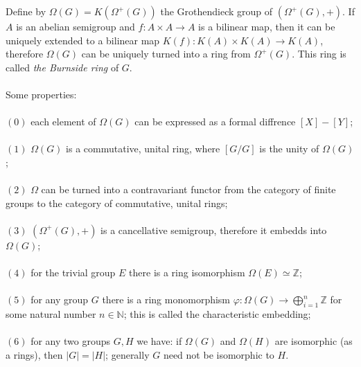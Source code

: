 \documentclass[12pt]{article}
\begin{document}
Define by $\Omega(G)=K(\Omega^{+}(G))$ the Grothendieck group of $(\Omega^{+}(G),+)$. If $A$ is an abelian semigroup and $f:A\times A\rightarrow A$ is a bilinear map, then it can be uniquely extended to a bilinear map $K(f):K(A)\times K(A)\rightarrow K(A)$, therefore $\Omega(G)$ can be uniquely turned into a ring from $\Omega^{+}(G)$. This ring is called \textit{the Burnside ring} of $G$.\\ \\
Some properties:\\ \\
$\mathrm{(0)}$ each element of $\Omega(G)$ can be expressed as a formal diffrence $[X]-[Y]$;\\ \\
$\mathrm{(1)}$ $\Omega(G)$ is a commutative, unital ring, where $[G/G]$ is the unity of $\Omega(G)$;\\ \\
$\mathrm{(2)}$ $\Omega$ can be turned into a contravariant functor from the category of finite groups to the category of commutative, unital rings;\\ \\
$\mathrm{(3)}$ $(\Omega^{+}(G),+)$ is a cancellative semigroup, therefore it embedds into $\Omega(G)$;\\ \\
$\mathrm{(4)}$ for the trivial group $E$ there is a ring isomorphism $\Omega(E)\simeq\mathbb{Z}$;\\ \\
$\mathrm{(5)}$ for any group $G$ there is a ring monomorphism $\varphi:\Omega(G)\rightarrow\bigoplus_{i=1}^{n}\mathbb{Z}$ for some natural number $n\in\mathbb{N}$; this is called the characteristic embedding;\\ \\
$\mathrm{(6)}$ for any two groups $G,H$ we have: if $\Omega(G)$ and $\Omega(H)$ are isomorphic (as a rings), then $|G|=|H|$; generally $G$ need not be isomorphic to $H$.
\end{document}

